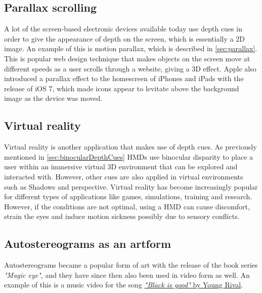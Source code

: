 	\subsection{Parallax scrolling}
	A lot of the screen-based electronic devices available today use depth cues in order to give the appearance of depth on the screen, which is essentially a 2D image. An example of this is motion parallax, which is described in \autoref{sec:parallax}. This is popular web design technique that makes objects on the screen move at different speeds as a user scrolls through a website, giving a 3D effect\citep{parallaxWeb}. Apple also introduced a parallax effect to the homescreen of iPhones and iPads with the release of iOS 7, which made icons appear to levitate above the background image as the device was moved\citep{ios7}.

	\subsection{Virtual reality}
	Virtual reality is another application that makes use of depth cues. As previously mentioned in \autoref{sec:binocularDepthCues} HMDs use binocular disparity to place a user within an immersive virtual 3D environment that can be explored and interacted with\citep{hmdCues}. However, other cues are also applied in virtual environments such as Shadows and perspective. Virtual reality has become increasingly popular for different types of applications like games, simulations, training and research. However, if the conditions are not optimal, using a HMD can cause discomfort, strain the eyes and induce motion sickness possibly due to sensory conflicts\citep{hmdCues,motionSickness}.

	\subsection{Autostereograms as an artform}
	Autostereograms became a popular form of art with the release of the book series \textit{"Magic eye"}\citep{autostereograms}, and they have since then also been used in video form as well. An example of this is a music video for the song \href{https://www.youtube.com/watch?v=2AKtp3XHn38}{\color{blue}\textit{"Black is good"} by Young Rival}.

